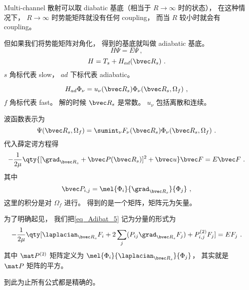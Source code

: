 
\begin{issues}
\issueDraft
\end{issues}


Multi-channel 散射可以取 diabatic 基底（相当于 $R\to \infty$ 时的状态）， 在这种情况下， $R\to\infty$ 时势能矩阵就没有任何 coupling， 而当 $R$ 较小时就会有 coupling。

但如果我们将势能矩阵对角化， 得到的基底就叫做 adiabatic 基底。
\begin{equation}
H \Psi = E \Psi~,
\end{equation}
\begin{equation}
H = T_s + H_{ad}(\bvec R_s)~.
\end{equation}
$s$ 角标代表 slow， $ad$ 下标代表 adiabatic。

\begin{equation}
H_{ad} \Phi_\nu = u_\nu (\bvec R_s) \Phi_\nu (\bvec R_s, \Omega_f)~,
\end{equation}
$f$ 角标代表 fast。 解的时候 $\bvec R_s$ 是常数。 $u_\nu$ 包括离散和连续。

波函数表示为
\begin{equation}
\Psi(\bvec R_s, \Omega_f) = \sumint_\nu F_\nu (\bvec R_s) \Phi_\nu(\bvec R_s, \Omega_f)~.
\end{equation}
代入薛定谔方程得
\begin{equation}\label{eq_Adibat_5}
-\frac{1}{2\mu} \qty{[\grad_{\bvec R_s} + \bvec P(\bvec R_s)]^2 + \bvec u} \bvec F = E \bvec F~.
\end{equation}
其中
\begin{equation}
\bvec P_{i,j} = \mel{\Phi_i}{\grad_{\bvec R_s}}{\Phi_j}~,
\end{equation}
这里的积分是对 $\Omega_f$ 进行。 得到的是一个矩阵，矩阵元为矢量。

为了明确起见， 我们把\autoref{eq_Adibat_5} 记为分量的形式为
\begin{equation}
-\frac{1}{2\mu} \qty[\laplacian_{\bvec R_s} F_i + 2\sum_j ( P_{ij} \grad_{\bvec R_s} F_j) + P_{i,j}^{(2)} F_j] = E F_j~.
\end{equation}
其中 $\mat P^{(2)}$ 矩阵定义为 $\mel{\Phi_i}{\laplacian_{\bvec R_s}}{\Phi_j}$， 其实就是 $\mat P$ 矩阵的平方。

到此为止所有公式都是精确的。
